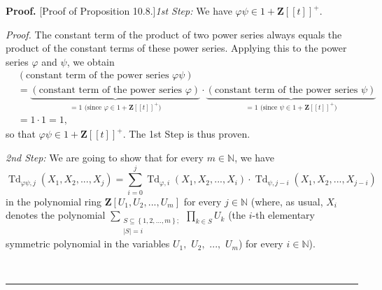 \documentclass[numbers=enddot,12pt,final,onecolumn,notitlepage]{scrartcl}%
\newenvironment{proof}[1][Proof]{\noindent\textbf{#1.} }{\ \rule{0.5em}{0.5em}}
\begin{document}
\begin{proof}
[Proof of Proposition 10.8.]\textit{1st Step:} We have $\varphi\psi
\in1+\mathbf{Z}\left[  \left[  t\right]  \right]  ^{+}$.

\textit{Proof.} The constant term of the product of two power series always
equals the product of the constant terms of these power series. Applying this
to the power series $\varphi$ and $\psi$, we obtain%
\begin{align*}
&  \left(  \text{constant term of the power series }\varphi\psi\right) \\
&  =\underbrace{\left(  \text{constant term of the power series }%
\varphi\right)  }_{=1\text{ (since }\varphi\in1+\mathbf{Z}\left[  \left[
t\right]  \right]  ^{+}\text{)}}\cdot\underbrace{\left(  \text{constant term
of the power series }\psi\right)  }_{=1\text{ (since }\psi\in1+\mathbf{Z}%
\left[  \left[  t\right]  \right]  ^{+}\text{)}}\\
&  =1\cdot1=1,
\end{align*}
so that $\varphi\psi\in1+\mathbf{Z}\left[  \left[  t\right]  \right]  ^{+}$.
The 1st Step is thus proven.

\textit{2nd Step:} We are going to show that for every $m\in\mathbb{N}$, we
have%
\[
\operatorname*{Td}\nolimits_{\varphi\psi,j}\left(  X_{1},X_{2},...,X_{j}%
\right)  =\sum_{i=0}^{j}\operatorname*{Td}\nolimits_{\varphi,i}\left(
X_{1},X_{2},...,X_{i}\right)  \cdot\operatorname*{Td}\nolimits_{\psi
,j-i}\left(  X_{1},X_{2},...,X_{j-i}\right)
\]
in the polynomial ring $\mathbf{Z}\left[  U_{1},U_{2},...,U_{m}\right]  $ for
every $j\in\mathbb{N}$ (where, as usual, $X_{i}$ denotes the polynomial
$\sum\limits_{\substack{S\subseteq\left\{  1,2,...,m\right\}  ;\\\left\vert
S\right\vert =i}}\prod\limits_{k\in S}U_{k}$ (the $i$-th elementary symmetric
polynomial in the variables $U_{1},$ $U_{2},$ $...,$ $U_{m}$) for every
$i\in\mathbb{N}$).


\end{proof}
\end{document}
